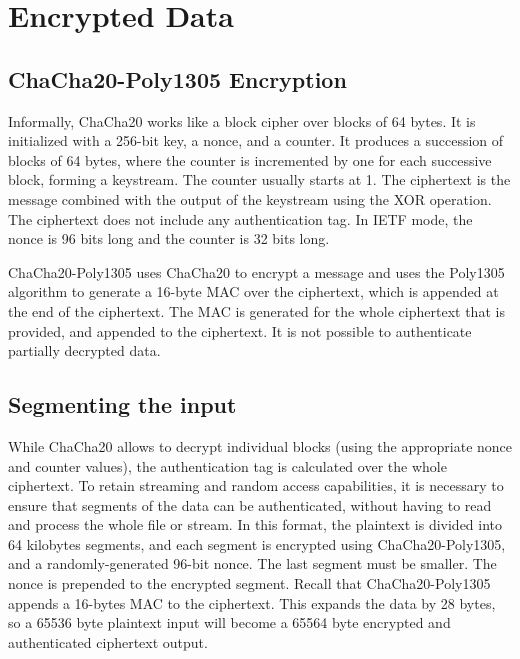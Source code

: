 \section{Encrypted Data}\label{data:encrypted}
\subsection{ChaCha20-Poly1305 Encryption}\label{data:encrypted:chacha20poly1305}

Informally, ChaCha20 works like a block cipher over blocks of 64 bytes.
%
It is initialized with a 256-bit key, a nonce, and a counter.
%
It produces a succession of blocks of 64 bytes, where the counter is incremented by one for each successive block, forming a keystream.
%
The counter usually starts at 1.
%
The ciphertext is the message combined with the output of the keystream using the XOR operation.
%
The ciphertext does not include any authentication tag.
%
In IETF mode, the nonce is 96 bits long and the counter is 32 bits long.

ChaCha20-Poly1305 uses ChaCha20 to encrypt a message and uses the Poly1305 algorithm to generate a 16-byte MAC over the ciphertext, which is appended at the end of the ciphertext.
%
The MAC is generated for the whole ciphertext that is provided, and appended to the ciphertext.
%
It is not possible to authenticate partially decrypted data.

\subsection{Segmenting the input}
%
While ChaCha20 allows to decrypt individual blocks (using the appropriate nonce and counter values), the authentication tag is calculated over the whole ciphertext.
%
To retain streaming and random access capabilities, it is necessary to ensure that segments of the data can be authenticated, without having to read and process the whole file or stream.
%
In this format, the plaintext is divided into 64 kilobytes segments, and each segment is encrypted using ChaCha20-Poly1305, and a randomly-generated 96-bit nonce. The last segment must be smaller.
%
The nonce is prepended to the encrypted segment. Recall that ChaCha20-Poly1305 appends a 16-bytes MAC to the ciphertext.
%
This expands the data by 28 bytes, so a 65536 byte plaintext input will become a 65564 byte encrypted and authenticated ciphertext output.

